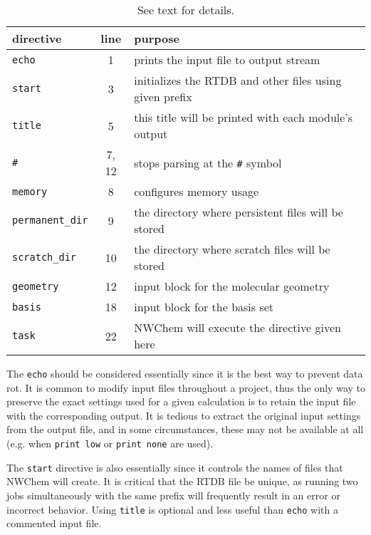 \documentclass[letterpaper,12pt]{article}
\begin{document}
\begin{table}[!hp]
    \label{tab:BasicInput}
    \caption{See text for details.}
    \begin{tabular}{lcl}
        directive               & line  & purpose \\
        \hline
        \texttt{echo}           & 1     & prints the input file to output stream \\
        \texttt{start}          & 3     & initializes the RTDB and other files using given prefix \\
        \texttt{title}          & 5     & this title will be printed with each module's output \\
        \texttt{\#}             & 7, 12 & stops parsing at the \texttt{\#} symbol \\
        \texttt{memory}         & 8     & configures memory usage \\
        \texttt{permanent\_dir} & 9     & the directory where persistent files will be stored \\
        \texttt{scratch\_dir}   & 10    & the directory where scratch files will be stored \\
        \texttt{geometry}       & 12    & input block for the molecular geometry \\
        \texttt{basis}          & 18    & input block for the basis set \\
        \texttt{task}           & 22    & NWChem will execute the directive given here
    \end{tabular}
\end{table}

The \texttt{echo} should be considered essentially since it is the best way to prevent data rot.  It is common to modify input files throughout a project, thus the only way to preserve the exact settings used for a given calculation is to retain the input file with the corresponding output.  It is tedious to extract the original input settings from the output file, and in some circumstances, these may not be available at all (e.g. when \texttt{print low} or \texttt{print none} are used).

The \texttt{start} directive is also essentially since it controls the names of files that NWChem will create.  It is critical that the RTDB file be unique, as running two jobs simultaneously with the same prefix will frequently result in an error or incorrect behavior.  Using \texttt{title} is optional and less useful than \texttt{echo} with a commented input file.
\end{document}
